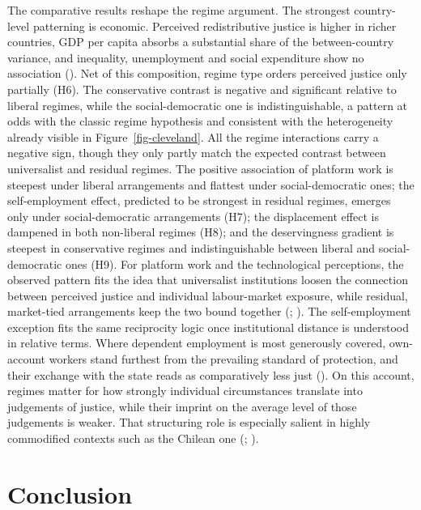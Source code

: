 \documentclass[
  12pt,
]{article}
\begin{document}
The comparative results reshape the regime argument. The strongest
country-level patterning is economic. Perceived redistributive justice
is higher in richer countries, GDP per capita absorbs a substantial
share of the between-country variance, and inequality, unemployment and
social expenditure show no association
(). Net of this
composition, regime type orders perceived justice only partially (H6).
The conservative contrast is negative and significant relative to
liberal regimes, while the social-democratic one is indistinguishable, a
pattern at odds with the classic regime hypothesis and consistent with
the heterogeneity already visible in Figure~\ref{fig-cleveland}. All the
regime interactions carry a negative sign, though they only partly match
the expected contrast between universalist and residual regimes. The
positive association of platform work is steepest under liberal
arrangements and flattest under social-democratic ones; the
self-employment effect, predicted to be strongest in residual regimes,
emerges only under social-democratic arrangements (H7); the displacement
effect is dampened in both non-liberal regimes (H8); and the
deservingness gradient is steepest in conservative regimes and
indistinguishable between liberal and social-democratic ones (H9). For
platform work and the technological perceptions, the observed pattern
fits the idea that universalist institutions loosen the connection
between perceived justice and individual labour-market exposure, while
residual, market-tied arrangements keep the two bound together
(;
). The
self-employment exception fits the same reciprocity logic once
institutional distance is understood in relative terms. Where dependent
employment is most generously covered, own-account workers stand
furthest from the prevailing standard of protection, and their exchange
with the state reads as comparatively less just
(). On
this account, regimes matter for how strongly individual circumstances
translate into judgements of justice, while their imprint on the average
level of those judgements is weaker. That structuring role is especially
salient in highly commodified contexts such as the Chilean one
(;
).

\section{Conclusion}\label{conclusion}
\end{document}
